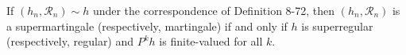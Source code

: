 If $(h_n, \mathcal{R}_n) \sim h$ under the correspondence of Definition 8-72, then $(h_n, \mathcal{R}_n)$ is a supermartingale (respectively, martingale) if and only if $h$ is superregular (respectively, regular) and $P^k h$ is finite-valued for all $k$.
